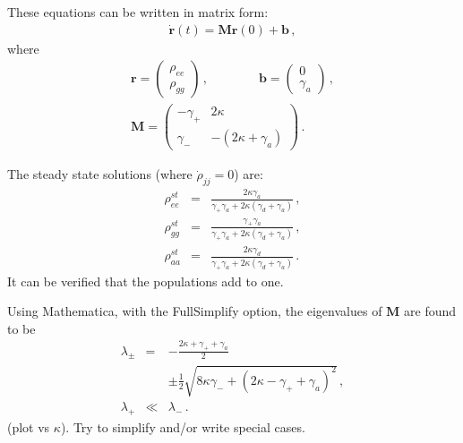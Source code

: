 \documentclass[twocolumn,aps,eqsecnum,showkeys,amsmath]{revtex4-2}
\begin{document}
These equations can be written in matrix form:
%
\begin{eqnarray}
\dot{\mathbf{r}}(t) = \mathbf{M} \mathbf{r}(0) +\mathbf{b} 	\,,
\end{eqnarray}
where 
%
\begin{eqnarray}
\mathbf{r} = \left( \begin{array}{c} \rho_{ee} \\ \rho_{gg} \end{array}  \right) \,, 
	\qquad \qquad
\mathbf{b} = \left( \begin{array}{c} 0 \\ \gamma_a \end{array}  \right) \,, \\
\mathbf{M} = \left( \begin{array}{cc} -\gamma_+ & 2\kappa \\ 
	\gamma_- & -(2\kappa +\gamma_a)  \end{array}  \right) \,.  
\end{eqnarray}
 
The steady state solutions (where $\dot{\rho}_{jj} =0$) are: 
%
\begin{subequations}
\begin{eqnarray}
\rho_{ee}^{st} &=& \frac{ 2\kappa \gamma_a }
		{ \gamma_+ \gamma_a +2\kappa (\gamma_d +\gamma_a) } \,, \\
\rho_{gg}^{st} &=& \frac{ \gamma_+ \gamma_a }
		{ \gamma_+ \gamma_a +2\kappa (\gamma_d +\gamma_a) } \,, \\ 
\rho_{aa}^{st} &=& \frac{ 2\kappa \gamma_d }
		{ \gamma_+ \gamma_a +2\kappa (\gamma_d +\gamma_a) } \,. 
\end{eqnarray}
\end{subequations}
It can be verified that the populations add to one. 

Using Mathematica, with the FullSimplify option, the eigenvalues of 
$\mathbf{M}$ are found to be
%
\begin{subequations}
\begin{eqnarray}
\lambda_{\pm} &=& - \frac{2\kappa +\gamma_+ +\gamma_a}{2} \nonumber \\
	&&\pm \frac{1}{2} 
	\sqrt{ 8\kappa \gamma_- +(2\kappa -\gamma_+ +\gamma_a)^2  } \,, \\
\lambda_+ &\ll& \lambda_- \,.  
\end{eqnarray}
\end{subequations}
(plot vs $\kappa$). Try to simplify and/or write special cases.  
\end{document}
